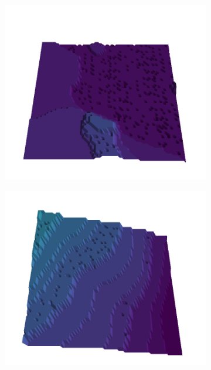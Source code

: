 \documentclass[../document.tex]{subfiles}
\begin{document}
\begin{figure}[H]
    \begin{subfigure}[b]{0.19\textwidth}
        \includegraphics[width=\linewidth]{../img/5/quarry/best//patch-3d-majavi-colormap-0.png}
    \end{subfigure}
    \begin{subfigure}[b]{0.19\textwidth}
        \includegraphics[width=\linewidth]{../img/5/quarry/best//patch-3d-majavi-colormap-1.png}
    \end{subfigure}  

\end{figure}
\end{document}
